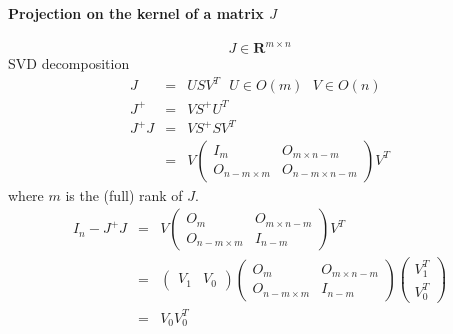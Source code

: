 \documentclass {article}
\newcommand\reals{\mathbf{R}}
\begin{document}
\paragraph {Projection on the kernel of a matrix $J$}
$$
J\in \reals^{m\times n}
$$
SVD decomposition
\begin{eqnarray*}
J &=& U S V^T \ \ \ U\in O(m)\ \ \ V\in O(n)\\
J^{+} &=& V S^{+} U^T \\
J^{+} J &=& V S^{+} S V^T \\
&=& V \left(\begin{array} {cc}
I_m & O_{m\times n-m} \\
O_{n-m\times m} & O_{n-m\times n-m}
\end{array}\right) V^T
\end{eqnarray*}
where $m$ is the (full) rank of $J$.
\begin{eqnarray*}
I_{n} - J^{+} J &=& V \left(\begin{array} {cc}
O_m & O_{m\times n-m} \\
O_{n-m\times m} & I_{n-m}
\end{array}\right) V^T \\
&=& \left(\begin{array}{cc}
V_{1} & V_{0} \end{array}\right)
\left(\begin{array} {cc}
O_m & O_{m\times n-m} \\
O_{n-m\times m} & I_{n-m}
\end{array}\right)
\left(\begin{array}{c}
V^T_{1} \\
V^T_{0} \end{array}\right)\\
&=&
V_0 V_0^T
\end{eqnarray*}
\end{document}
